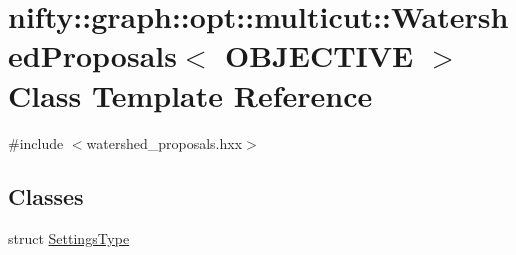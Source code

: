 \hypertarget{classnifty_1_1graph_1_1opt_1_1multicut_1_1WatershedProposals}{}\section{nifty\+:\+:graph\+:\+:opt\+:\+:multicut\+:\+:Watershed\+Proposals$<$ O\+B\+J\+E\+C\+T\+I\+VE $>$ Class Template Reference}
\label{classnifty_1_1graph_1_1opt_1_1multicut_1_1WatershedProposals}


{\ttfamily \#include $<$watershed\+\_\+proposals.\+hxx$>$}

\subsection*{Classes}
\begin{DoxyCompactItemize}
\item 
struct \hyperlink{structnifty_1_1graph_1_1opt_1_1multicut_1_1WatershedProposals_1_1SettingsType}{Settings\+Type}
\end{DoxyCompactItemize}
